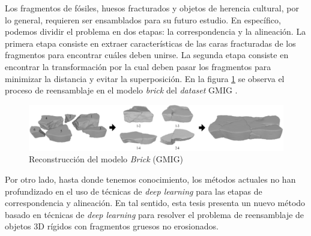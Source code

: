 \label{section:problema}


Los fragmentos de fósiles, huesos fracturados y objetos de herencia cultural, por lo general, requieren ser ensamblados para su futuro estudio. En específico, podemos dividir el problema en dos etapas: la correspondencia y la alineación. La primera etapa consiste en extraer características de las caras fracturadas de los fragmentos para encontrar cuáles deben unirse. La segunda etapa consiste en encontrar la transformación por la cual deben pasar los fragmentos para minimizar la distancia y evitar la superposición. En la figura \ref{fig:brick} se observa el proceso de reensamblaje en el modelo \textit{brick} del \textit{dataset} GMIG \cite{13}.

\begin{figure}[!h]
    \centering
     \includegraphics[scale=0.21]{images/brick.png}
    \caption{Reconstrucción del modelo \textit{Brick} (GMIG)}
    \label{fig:brick}
\end{figure}

\newpage

Por otro lado, hasta donde tenemos conocimiento, los métodos actuales no han profundizado en el uso de técnicas de \textit{deep learning} para las etapas de correspondencia y alineación. En tal sentido, esta tesis presenta un nuevo método basado en técnicas de \textit{deep learning} para resolver el problema de reensamblaje de objetos 3D rígidos con fragmentos gruesos no erosionados.
